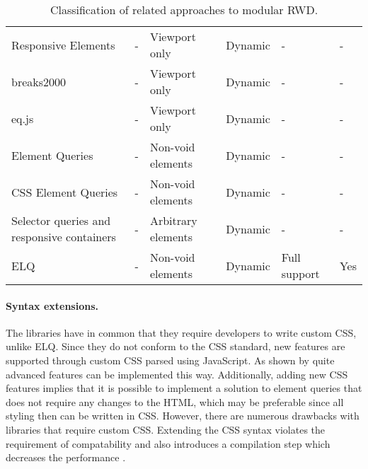 \documentclass[]{llncs}
\newcommand{\elq}{ELQ}
\begin{document}
\begin{table*}[ht!]
\begin{tabular}[t]{ p{3cm} l l l l l }
       Responsive Elements \cite{eq_imp_responsive-elements-2}    &                                 - &   Viewport only &                 Dynamic &    -                  & -  \\
       breaks2000 \cite{eq_imp_breaks2000}                        &                                 - &   Viewport only &                 Dynamic &    -                  & -  \\
       eq.js \cite{eq_imp_eqjs}                                   &                                 - &   Viewport only &                 Dynamic &    -                  & -  \\
       Element Queries \cite{eq_imp_element-queries}              &                                 - &   Non-void elements &             Dynamic &    -                  & -  \\
       CSS Element Queries \cite{eq_imp_css-element-queries}      &                                 - &   Non-void elements &             Dynamic &    -                  & -  \\
       Selector queries and responsive containers \cite{eq_imp_selector_queries}                  & - &   Arbitrary elements &            Dynamic &    -                  & -  \\
       \elq{}                                                                                     & - &   Non-void elements &             Dynamic &    Full support       & Yes \\
    \end{tabular}
    \vspace{.5cm}
    \caption{Classification of related approaches to modular RWD.}
    \label{table:approaches-classifications}
  \end{table*}

  \paragraph{Syntax extensions.}
  The libraries \cite{eq_imp_magichtml,eq_imp_eqcss,eq_imp_prollyfill-min-width,eq_imp_localised-css,eq_imp_gss} have in common that they require developers to write custom CSS, unlike \elq{}.
  Since they do not conform to the CSS standard, new features are supported through custom CSS parsed using JavaScript.
  As shown by \cite{eq_imp_eqcss,eq_imp_gss} quite advanced features can be implemented this way.
  Additionally, adding new CSS features implies that it is possible to implement a solution to element queries that does not require any changes to the HTML, which may be preferable since all styling then can be written in CSS.
  However, there are numerous drawbacks with libraries that require custom CSS.
  Extending the CSS syntax violates the requirement of compatability and also introduces a compilation step which decreases the performance \cite{elq-thesis}.
\end{document}
